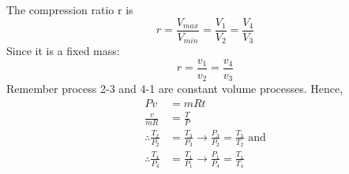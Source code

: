 \documentclass[class=report, crop=false, 12pt,a4paper]{standalone}
\begin{document}
The compression ratio r is
\begin{equation}
  r = \frac{V_{max}}{V_{min}} = \frac{V_1}{V_2} = \frac{V_4}{V_3}
\end{equation}
Since it is a fixed mass:
\begin{equation}
  r = \frac{v_1}{v_2} = \frac{v_4}{v_3}
\end{equation}
Remember process 2-3 and 4-1  are constant volume processes. Hence, 
\begin{align}
  Pv &= mRt\\
  \frac{v}{mR} &= \frac{T}{P}\\
  \therefore \frac{T_2}{P_2} &= \frac{T_3}{P_3} \rightarrow \frac{P_3}{P_2} = \frac{T_3}{T_2} \textrm{ and}\\
  \therefore \frac{T_4}{P_4} &= \frac{T_1}{P_1} \rightarrow \frac{P_1}{P_4} = \frac{T_1}{T_4}
\end{align}
\end{document}
